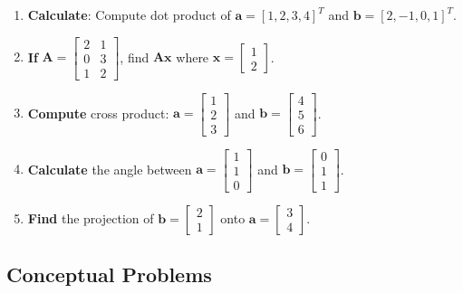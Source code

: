 \documentclass[12pt,a4paper]{article}
\theoremstyle{definition}
\begin{document}
\begin{enumerate}
\item \textbf{Calculate}: Compute dot product of $\mathbf{a} = [1, 2, 3, 4]^T$ and $\mathbf{b} = [2, -1, 0, 1]^T$.

\item \textbf{If} $\mathbf{A} = \begin{bmatrix} 2 & 1 \\ 0 & 3 \\ 1 & 2 \end{bmatrix}$, find $\mathbf{A}\mathbf{x}$ where $\mathbf{x} = \begin{bmatrix} 1 \\ 2 \end{bmatrix}$.

\item \textbf{Compute} cross product: $\mathbf{a} = \begin{bmatrix} 1 \\ 2 \\ 3 \end{bmatrix}$ and $\mathbf{b} = \begin{bmatrix} 4 \\ 5 \\ 6 \end{bmatrix}$.

\item \textbf{Calculate} the angle between $\mathbf{a} = \begin{bmatrix} 1 \\ 1 \\ 0 \end{bmatrix}$ and $\mathbf{b} = \begin{bmatrix} 0 \\ 1 \\ 1 \end{bmatrix}$.

\item \textbf{Find} the projection of $\mathbf{b} = \begin{bmatrix} 2 \\ 1 \end{bmatrix}$ onto $\mathbf{a} = \begin{bmatrix} 3 \\ 4 \end{bmatrix}$.
\end{enumerate}

\subsection{Conceptual Problems}
\end{document}
